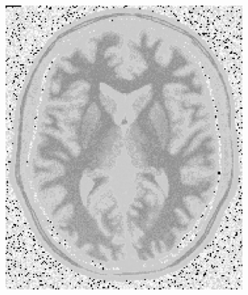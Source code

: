 \documentclass[letterpaper,12pt]{article}
\theoremstyle{plain}
\begin{document}
\begin{figure}[h]
\begin{subfigure}[h]{0.24\linewidth}
            \includegraphics[width=\textwidth]{Figuras/sustraction_EQ.png}
        \end{subfigure}
                \caption{Diferencia entre la imagen original y la imagen ecualizada.}
                \label{fig:EQ_sustraction}
         \begin{subfigure}[h]{0.24\linewidth}
            \centering

\end{subfigure}
\end{figure}
\end{document}
